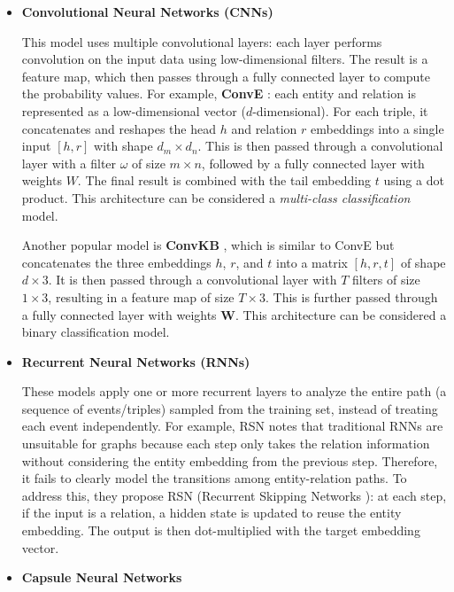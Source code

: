 \begin{itemize}
	\item \textbf{Convolutional Neural Networks (CNNs)}
	
	This model uses multiple convolutional layers: each layer performs convolution on the input data using low-dimensional filters. The result is a feature map, which then passes through a fully connected layer to compute the probability values. For example, \textbf{ConvE} \cite{dettmers2017convolutional}: each entity and relation is represented as a low-dimensional vector ($d$-dimensional). For each triple, it concatenates and reshapes the head $h$ and relation $r$ embeddings into a single input $[h, r]$ with shape $d_m \times d_n$. This is then passed through a convolutional layer with a filter $\omega$ of size $m \times n$, followed by a fully connected layer with weights $W$. The final result is combined with the tail embedding $t$ using a dot product. This architecture can be considered a \textit{multi-class classification} model.
	
	Another popular model is \textbf{ConvKB} \cite{nguyen2017novel}, which is similar to ConvE but concatenates the three embeddings $h$, $r$, and $t$ into a matrix $[h, r, t]$ of shape $d \times 3$. It is then passed through a convolutional layer with $T$ filters of size $1 \times 3$, resulting in a feature map of size $T \times 3$. This is further passed through a fully connected layer with weights $\mathbf{W}$. This architecture can be considered a binary classification model.
	
	\item \textbf{Recurrent Neural Networks (RNNs)}
	
	These models apply one or more recurrent layers to analyze the entire path (a sequence of events/triples) sampled from the training set, instead of treating each event independently. For example, RSN \cite{guo2019learning} notes that traditional RNNs are unsuitable for graphs because each step only takes the relation information without considering the entity embedding from the previous step. Therefore, it fails to clearly model the transitions among entity-relation paths. To address this, they propose RSN (Recurrent Skipping Networks \cite{guo2019learning}): at each step, if the input is a relation, a hidden state is updated to reuse the entity embedding. The output is then dot-multiplied with the target embedding vector.
	
	\item \textbf{Capsule Neural Networks}
	

\end{itemize}
